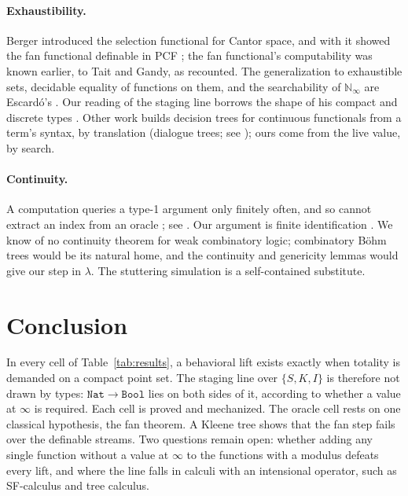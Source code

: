 \documentclass[acmsmall,review,screen]{acmart}\def\acmclass{}
\theoremstyle{plain}
\theoremstyle{definition}
\theoremstyle{remark}
\newcommand{\Nat}{\mathtt{Nat}}
\newcommand{\Bool}{\mathtt{Bool}}
\begin{document}
\paragraph{Exhaustibility.}  Berger introduced the selection functional for Cantor space,
and with it showed the fan functional definable in PCF \citep{Berger1990}; the fan
functional's computability was known earlier, to Tait and Gandy, as \citet{Escardo2008}
recounted.  The generalization to exhaustible sets, decidable equality of functions on
them, and the searchability of $\mathbb{N}_\infty$ are Escard\'o's
\citep{Escardo2007,Escardo2008,EscardoBlog2007}.  Our reading of the staging line borrows
the shape of his compact and discrete types \citep[Thm.~4.13]{Escardo2008}.  Other work builds decision trees for
continuous functionals from a term's syntax, by translation (dialogue
trees; see \citet{BaillonMahboubiPedrot2026}); ours come from the live value, by search.
\paragraph{Continuity.}  A computation queries a type-1 argument only finitely often,
and so cannot extract an index from an oracle \citep[\S2.3--2.4]{Longley2005};
see \citet{LongleyNormann2015}.  Our argument is finite identification
\citep{Balbach2020}.  We know of no continuity theorem for weak combinatory logic;
combinatory B\"ohm trees \citep{DybjerKuperberg2012} would be its natural home, and the continuity and genericity lemmas
\citep[\S14.3]{Barendregt1984} would give our step in $\lambda$.  The stuttering simulation is a self-contained substitute.

\section{Conclusion}\label{sec:conclusion}
In every cell of Table~\ref{tab:results}, a behavioral lift exists exactly when
totality is demanded on a compact point set.  The staging line over $\{S,K,I\}$ is
therefore not drawn by types: $\Nat\to\Bool$ lies on both sides of it, according to
whether a value at $\infty$ is required.  Each cell is proved and mechanized.  The
oracle cell rests on one classical hypothesis, the fan theorem.  A Kleene tree shows that the
fan step fails over the definable streams.  Two questions remain
open: whether adding any single function without a value at $\infty$ to the functions
with a modulus defeats every lift, and where the line falls in calculi with an
intensional operator, such as SF-calculus and tree calculus.
\end{document}
